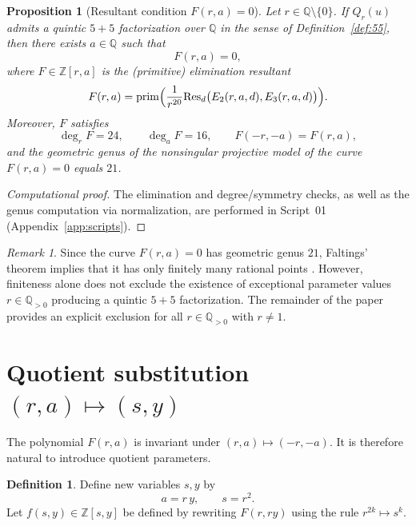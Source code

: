 \documentclass[12pt]{article}
\newtheorem{proposition}{Proposition}
\theoremstyle{remark}
\newtheorem{remark}{Remark}
\theoremstyle{definition}
\newtheorem{definition}{Definition}
\begin{document}
\begin{proposition}[Resultant condition $F(r,a)=0$]\label{prop:F}
Let $r\in\mathbb{Q}\setminus\{0\}$.
If $Q_r(u)$ admits a quintic $5+5$ factorization over $\mathbb{Q}$ in the sense of Definition~\ref{def:55}, then there exists $a\in\mathbb{Q}$ such that
\begin{equation}\label{eq:F}
F(r,a)=0,
\end{equation}
where $F\in\mathbb{Z}[r,a]$ is the (primitive) elimination resultant
\[
F(r,a)=\mathrm{prim}\Bigl(\frac{1}{r^{20}}\mathrm{Res}_d\bigl(E_2(r,a,d),E_3(r,a,d)\bigr)\Bigr).
\]
Moreover, $F$ satisfies
\[
\deg_r F=24,\qquad \deg_a F=16,\qquad F(-r,-a)=F(r,a),
\]
and the geometric genus of the nonsingular projective model of the curve $F(r,a)=0$ equals $21$.
\end{proposition}

\begin{proof}[Computational proof]
The elimination and degree/symmetry checks, as well as the genus computation via normalization, are performed in Script~01 (Appendix~\ref{app:scripts}).
\end{proof}

\begin{remark}\label{rem:faltings}
Since the curve $F(r,a)=0$ has geometric genus $21$, Faltings' theorem implies that it has only finitely many rational points \cite{Faltings}.
However, finiteness alone does not exclude the existence of exceptional parameter values $r\in\mathbb{Q}_{>0}$ producing a quintic $5+5$ factorization.
The remainder of the paper provides an explicit exclusion for all $r\in\mathbb{Q}_{>0}$ with $r\neq 1$.
\end{remark}


\section{Quotient substitution \texorpdfstring{$(r,a)\mapsto (s,y)$}{(r,a)->(s,y)}}\label{sec:quotient}

The polynomial $F(r,a)$ is invariant under $(r,a)\mapsto (-r,-a)$.
It is therefore natural to introduce quotient parameters.

\begin{definition}\label{def:sy}
Define new variables $s,y$ by
\begin{equation}\label{eq:substy}
a=r\,y,\qquad s=r^2.
\end{equation}
Let $f(s,y)\in\mathbb{Z}[s,y]$ be defined by rewriting $F(r,r y)$ using the rule $r^{2k}\mapsto s^k$.
\end{definition}
\end{document}
